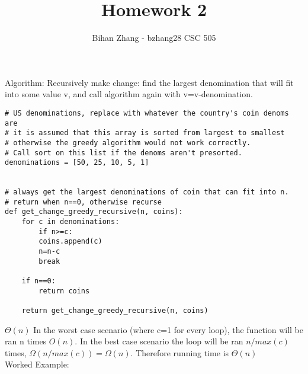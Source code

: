 \documentclass[12pt]{article}
\newenvironment{question}[2][Question]{\begin{trivlist}
		\item[\hskip \labelsep {\bfseries #1}\hskip \labelsep {\bfseries #2.}]}{\end{trivlist}}
\begin{document}
	
	
	
	\title{Homework 2}%
	\author{Bihan Zhang - bzhang28 %
		CSC 505} %
	
	\maketitle
	
	
	\begin{question}{1a} 
			Algorithm: Recursively make change: find the largest denomination that will fit into some value v, and call algorithm again with v=v-denomination.
			
			
		\begin{lstlisting}
# US denominations, replace with whatever the country's coin denoms are
# it is assumed that this array is sorted from largest to smallest 
# otherwise the greedy algorithm would not work correctly.
# Call sort on this list if the denoms aren't presorted.
denominations = [50, 25, 10, 5, 1]

		
# always get the largest denominations of coin that can fit into n.
# return when n==0, otherwise recurse
def get_change_greedy_recursive(n, coins):
	for c in denominations:
		if n>=c:
		coins.append(c)
		n=n-c
		break
	
	if n==0:
		return coins
	
	return get_change_greedy_recursive(n, coins)
		\end{lstlisting}	
		

		$\Theta(n)$ In the worst case scenario (where c=1 for every loop), the function will be ran n times $O(n)$. In the best case scenario the loop will be ran $n/max(c)$ times, $\Omega(n/max(c))= \Omega(n)$. Therefore running time is $\Theta(n)$\\
		
		
		Worked Example:
		
		
		

\end{question}
\end{document}
